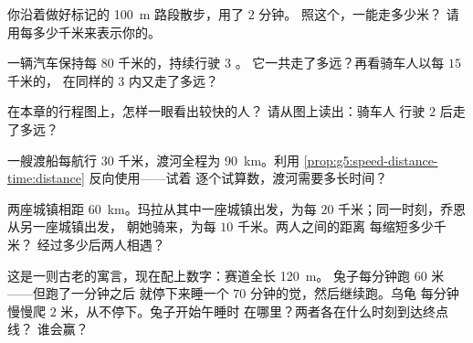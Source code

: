 \begin{exercise}[$\star$]\label{exo:g5:speed-distance-time:6}
你沿着做好标记的 \qty{100}{m} 路段散步，用了 $2$ 分钟。
照这个，一能走多少米？
请用每多少千米来表示你的。
\end{exercise}

\begin{exercise}[$\star$]\label{exo:g5:speed-distance-time:7}
一辆汽车保持每 $80$ 千米的，持续行驶 $3$ 。
它一共走了多远？再看骑车人以每 $15$ 千米的，
在同样的 $3$ 内又走了多远？
\end{exercise}

\begin{exercise}[$\star$]\label{exo:g5:speed-distance-time:8}
在本章的行程图上，怎样一眼看出较快的人？
请从图上读出：骑车人
行驶 $2$ 后走了多远？
\end{exercise}

\begin{exercise}[$\star\star$]\label{exo:g5:speed-distance-time:9}
一艘渡船每航行 $30$ 千米，渡河全程为
\qty{90}{km}。利用
\cref{prop:g5:speed-distance-time:distance} 反向使用——试着
逐个试算数，渡河需要多长时间？
\end{exercise}

\begin{exercise}[$\star\star$]\label{exo:g5:speed-distance-time:10}
两座城镇相距 \qty{60}{km}。玛拉从其中一座城镇出发，为每 $20$
千米；同一时刻，乔恩从另一座城镇出发，
朝她骑来，为每 $10$ 千米。两人之间的距离
每缩短多少千米？
经过多少后两人相遇？
\end{exercise}

\begin{exercise}[$\star\star$]\label{exo:g5:speed-distance-time:11}
这是一则古老的寓言，现在配上数字：赛道全长 \qty{120}{m}。
兔子每分钟跑 $60$ 米——但跑了一分钟之后
就停下来睡一个 $70$ 分钟的觉，然后继续跑。乌龟
每分钟慢慢爬 $2$ 米，从不停下。兔子开始午睡时
在哪里？两者各在什么时刻到达终点线？
谁会赢？
\end{exercise}
